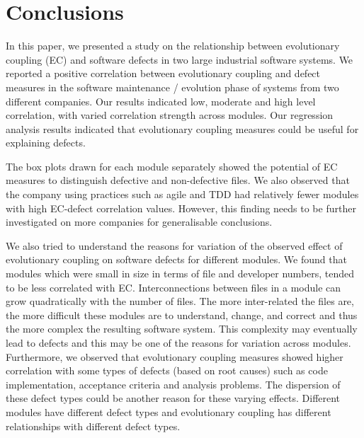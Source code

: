 \documentclass[times]{smrauth}
\begin{document}
\section{Conclusions}

In this paper, we presented a study on the relationship between evolutionary coupling (EC) and software defects in two large industrial software systems. We reported a positive correlation between evolutionary coupling and defect measures in the software maintenance / evolution phase of systems from two different companies. Our results indicated low, moderate and high level correlation, with varied correlation strength across modules. Our regression analysis results indicated that evolutionary coupling measures could be useful for explaining defects.  


The box plots drawn for each module separately showed the potential of EC measures to distinguish  defective and non-defective files. We also observed that the company using practices such as agile and TDD had relatively fewer modules with high EC-defect correlation values. However, this finding needs to be further investigated on more companies for generalisable conclusions.

We also tried to understand the reasons for variation of the observed effect of evolutionary coupling on software defects for different modules. We found that modules which were small in size in terms of file and developer numbers, tended to be less correlated with EC. Interconnections between files in a module can grow quadratically with the number of files. The more inter-related the files are, the more difficult these modules are to understand, change, and correct and thus the more complex the resulting software system. This complexity may eventually lead to defects and this may be one of the reasons for variation across modules. Furthermore, we observed that evolutionary coupling measures showed higher correlation with some types of defects (based on root causes) such as code implementation, acceptance criteria and analysis problems. The dispersion of these defect types could be another reason for these varying effects. Different modules have different defect types and evolutionary coupling has different relationships with different defect types. %
\end{document}
